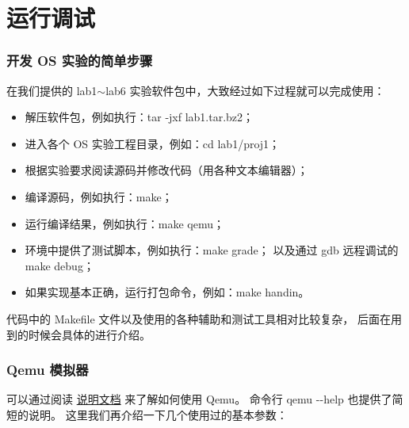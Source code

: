 \section{运行调试}

\subsubsection{开发 OS 实验的简单步骤}

在我们提供的 lab1$\sim$lab6 实验软件包中，大致经过如下过程就可以完成使用：
\begin{small}
\begin{itemize}[label=$\triangleright$]
    \item %
        解压软件包，例如执行：tar -jxf lab1.tar.bz2；
    \item %
        进入各个 OS 实验工程目录，例如：cd lab1/proj1；
    \item %
        根据实验要求阅读源码并修改代码（用各种文本编辑器）；
    \item %
        编译源码，例如执行：make；
    \item %
        运行编译结果，例如执行：make qemu；
    \item %
        环境中提供了测试脚本，例如执行：make grade；
        以及通过 gdb 远程调试的 make debug；
    \item %
        如果实现基本正确，运行打包命令，例如：make handin。
\end{itemize}
\end{small}

代码中的 Makefile 文件以及使用的各种辅助和测试工具相对比较复杂，
后面在用到的时候会具体的进行介绍。

\subsubsection{Qemu 模拟器}

可以通过阅读 \href{http://wiki.qemu.org/download/qemu-doc.html}{说明文档}
来了解如何使用 Qemu。
命令行 qemu -{}-help 也提供了简短的说明。
这里我们再介绍一下几个使用过的基本参数：

